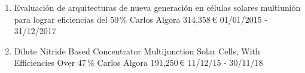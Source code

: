\begin{enumerate}[leftmargin=2.5mm, labelsep=-5mm]
	\setcounter{enumi}{0}

\item \begin{project}
	{Evaluación de arquitecturas de nueva generación en células solares multiunión para lograr eficiencias del 50\,\%}
	{Carlos Algora}
	{314,358\,\euro}
	{01/01/2015 - 31/12/2017}
	\end{project}

\item \begin{project}
	{Dilute Nitride Based Concentrator Multijunction Solar Cells, With Efficiencies Over 47\,\%}
	{Carlos Algora}
	{191,250\,\euro}
	{11/12/15 - 30/11/18}
	\end{project}
\end{enumerate}